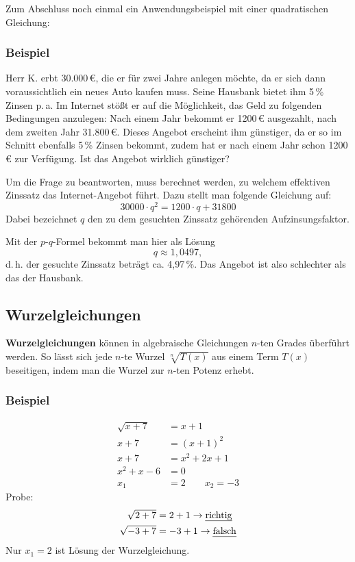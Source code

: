 Zum Abschluss noch einmal ein Anwendungsbeispiel mit einer quadratischen Gleichung:

\subsubsection{Beispiel}

Herr K. erbt 30.000\,€, die er für zwei Jahre anlegen möchte, da er sich dann voraussichtlich ein neues Auto kaufen muss. Seine Hausbank bietet ihm 5\,\% Zinsen p.\,a. Im Internet stößt er auf die Möglichkeit, das Geld zu folgenden Bedingungen anzulegen: Nach einem Jahr bekommt er 1200\,€ ausgezahlt, nach dem zweiten Jahr 31.800\,€. Dieses Angebot erscheint ihm günstiger, da er so im Schnitt ebenfalls 5\,\% Zinsen bekommt, zudem hat er nach einem Jahr schon 1200\,€ zur Verfügung. Ist das Angebot wirklich günstiger?

Um die Frage zu beantworten, muss berechnet werden, zu welchem effektiven Zinssatz das Internet-Angebot führt. Dazu stellt man folgende Gleichung auf:
\[ 30000 \cdot q^2 = 1200 \cdot q + 31800 \]
Dabei bezeichnet $q$ den zu dem gesuchten Zinssatz gehörenden Aufzinsungsfaktor.

Mit der $p$-$q$-Formel bekommt man hier als Lösung
\[ q \approx 1{,}0497 , \]
d.\,h. der gesuchte Zinssatz beträgt ca. 4{,}97\,\%. Das Angebot ist also schlechter als das der Hausbank.\beispielende

\subsection{Wurzelgleichungen}

\textbf{Wurzelgleichungen} können in algebraische Gleichungen $n$-ten Grades überführt werden. So lässt sich jede $n$-te Wurzel $\sqrt[n]{T(x)}$ aus einem Term $T(x)$ beseitigen, indem man die Wurzel zur $n$-ten Potenz erhebt.

\subsubsection{Beispiel}

\begin{align*}
  \sqrt{x + 7} &= x + 1\\
  x + 7 &= (x+1)^2\\
  x + 7 &= x^2 + 2x + 1\\
  x^2 + x - 6 &= 0\\
  x_1 &= 2 \qquad x_2 = -3
\end{align*}
Probe:
\begin{align*}
  \sqrt{2 + 7} &= 2 + 1 \rightarrow \text{\emph{richtig}}\\
  \sqrt{-3 + 7} &= -3 + 1 \rightarrow \text{\emph{falsch}}
\end{align*}
Nur $x_1 = 2$ ist Lösung der Wurzelgleichung.\beispielende

